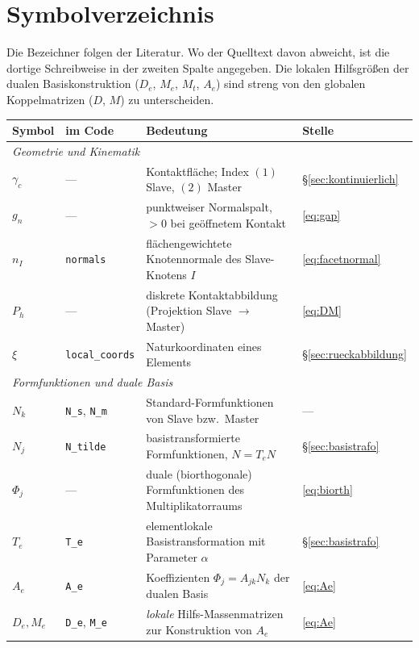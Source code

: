 \documentclass[a4paper,11pt]{article}
\def\bm#1{#1}%
\def\tilde#1{#1}%
\newcommand{\code}[1]{\texttt{\small #1}}
\let\stdsection\section
\renewcommand{\section}{\clearpage\stdsection}
\begin{document}
\section*{Symbolverzeichnis}

Die Bezeichner folgen der Literatur. Wo der Quelltext davon abweicht, ist die dortige Schreibweise
in der zweiten Spalte angegeben. Die lokalen Hilfsgrößen der dualen Basiskonstruktion ($\bm D_e$,
$\bm M_e$, $\bm M_t$, $\bm A_e$) sind streng von den globalen Koppelmatrizen ($\bm D$, $\bm M$) zu
unterscheiden.

\begin{center}
\small
\begin{tabularx}{\linewidth}{llXl}
\toprule
Symbol & im Code & Bedeutung & Stelle \\
\midrule
\multicolumn{4}{l}{\emph{Geometrie und Kinematik}}\\
$\gamma_c$ & --- & Kontaktfläche; Index $(1)$ Slave, $(2)$ Master & \S\ref{sec:kontinuierlich} \\
$g_n$ & --- & punktweiser Normalspalt, $>0$ bei geöffnetem Kontakt & \eqref{eq:gap} \\
$\bm n_I$ & \code{normals} & flächengewichtete Knotennormale des Slave-Knotens $I$ & \eqref{eq:facetnormal} \\
$P_h$ & --- & diskrete Kontaktabbildung (Projektion Slave $\to$ Master) & \eqref{eq:DM} \\
$\bm\xi$ & \code{local\_coords} & Naturkoordinaten eines Elements & \S\ref{sec:rueckabbildung} \\
\midrule
\multicolumn{4}{l}{\emph{Formfunktionen und duale Basis}}\\
$N_k$ & \code{N\_s}, \code{N\_m} & Standard-Formfunktionen von Slave bzw.\ Master & --- \\
$\tilde N_j$ & \code{N\_tilde} & basistransformierte Formfunktionen, $\tilde{\bm N}=\bm T_e\bm N$ & \S\ref{sec:basistrafo} \\
$\Phi_j$ & --- & duale (biorthogonale) Formfunktionen des Multiplikatorraums & \eqref{eq:biorth} \\
$\bm T_e$ & \code{T\_e} & elementlokale Basistransformation mit Parameter $\alpha$ & \S\ref{sec:basistrafo} \\
$\bm A_e$ & \code{A\_e} & Koeffizienten $\Phi_j=A_{jk}N_k$ der dualen Basis & \eqref{eq:Ae} \\
$\bm D_e,\bm M_e$ & \code{D\_e}, \code{M\_e} & \emph{lokale} Hilfs-Massenmatrizen zur Konstruktion von $\bm A_e$ & \eqref{eq:Ae} \\

\end{tabularx}
\end{center}
\end{document}
